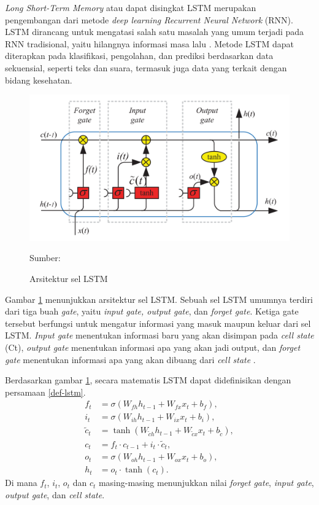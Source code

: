 \textit{Long Short-Term Memory} atau dapat disingkat LSTM merupakan pengembangan dari metode \textit{deep learning Recurrent Neural Network} (RNN). LSTM dirancang untuk mengatasi salah satu masalah yang umum terjadi pada RNN tradisional, yaitu hilangnya informasi masa lalu \parencite{hochreiterLongShorttermMemory1997}. Metode LSTM dapat diterapkan pada klasifikasi, pengolahan, dan prediksi berdasarkan data sekuensial, seperti teks dan suara,  termasuk juga data yang terkait dengan bidang kesehatan.

\begin{figure}[H]
  \centering
  \includegraphics[width=.7\linewidth]{img/ecg-arch.png}
  \caption{Arsitektur sel LSTM}
  Sumber: \textcite{yuReviewRecurrentNeural2019}
  \label{fig:arsitektur-lstm}
\end{figure}

Gambar \ref{fig:arsitektur-lstm} menunjukkan arsitektur sel LSTM. Sebuah sel LSTM umumnya terdiri dari tiga buah \textit{gate}, yaitu \textit{input gate, output gate}, dan \textit{forget gate}. Ketiga gate tersebut berfungsi untuk mengatur informasi yang masuk maupun keluar dari sel LSTM.
\textit{Input gate} menentukan informasi baru yang akan disimpan pada \textit{cell state} (Ct), \textit{output gate} menentukan informasi apa yang akan jadi output, dan \textit{forget gate} menentukan informasi apa yang akan dibuang dari \textit{cell state} \parencite{yuReviewRecurrentNeural2019}.

Berdasarkan gambar \ref{fig:arsitektur-lstm}, secara matematis LSTM dapat didefinisikan dengan persamaan \ref{def-lstm}.
\begin{equation}
\begin{split}
    f_t &= \sigma (W_{fh}h_{t-1} + W_{fx}x_t + b_f), \\
    i_t &= \sigma (W_{ih}h_{t-1} + W_{ix}x_t + b_i),\\
    \tilde{c}_t &= \tanh (W_{\tilde{c}h}h_{t-1} + W_{\tilde{c}x}x_t + b_{\tilde{c}}), \\
    c_t &= f_t \cdot c_{t-1}+ i_t \cdot \tilde{c}_t,\\
    o_t &= \sigma (W_{oh}h_{t-1} + W_{ox}x_t + b_o), \\
    h_t &= o_t \cdot \tanh(c_t).
\end{split}
    \label{def-lstm}
\end{equation}
\noindent
Di mana \(f_t\), \(i_t\), \(o_t\) dan \(c_t\) masing-masing menunjukkan nilai \emph{forget gate}, \emph{input gate}, \emph{output gate}, dan \emph{cell state}.

